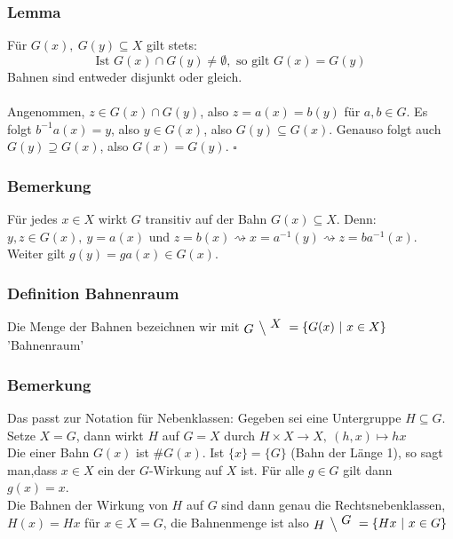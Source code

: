\subsubsection*{Lemma}
Für  $G(x),~G(y)\subseteq X$ gilt stets:\[ \text{Ist } G(x)\cap G(y)\not=\emptyset, \text{ so gilt } G(x)=G(y)\]
Bahnen sind entweder disjunkt oder gleich.\\

\\
Angenommen, $z\in G(x)\cap G(y)$, also $z=a(x)=b(y)$ für $a,b\in G$. Es folgt $b^{-1}a(x)=y$, also $y\in G(x)$, also $G(y)\subseteq G(x)$. Genauso folgt auch $G(y)\supseteq G(x)$, also $G(x)=G(y)$.
\hfill $\square$

\subsubsection*{Bemerkung}
Für jedes $x\in X$ wirkt $G$ transitiv auf der Bahn $G(x)\subseteq X$. Denn: $y,z\in G(x),~y=a(x)$ und $z=b(x)\rightsquigarrow x=a^{-1}(y) \rightsquigarrow z=ba^{-1}(x)$. Weiter gilt $g(y)=ga(x)\in G(x)$.
\subsubsection*{Definition Bahnenraum}
Die Menge der Bahnen bezeichnen wir mit $\xfrac{G}{X}=\{G(x)~|~x\in X \}$ 'Bahnenraum'
\subsubsection*{Bemerkung}
Das passt zur Notation für Nebenklassen: Gegeben sei eine Untergruppe $H\subseteq G$. Setze $X=G$, dann wirkt $H$ auf $G=X$ durch $H\times X\to X,~(h,x)\mapsto hx$\\
Die  einer Bahn $G(x)$ ist $\#G(x)$. Ist $\{x\}=\{G\}$ (Bahn der Länge 1), so sagt man,dass $x\in X$ ein  der $G$-Wirkung auf $X$ ist. Für alle $g\in G$ gilt dann $g(x)=x$.\\
Die Bahnen der Wirkung von $H$ auf $G$ sind dann genau die Rechtsnebenklassen, $H(x)=Hx$ für $x\in X=G$, die Bahnenmenge ist also $\xfrac{H}{G}=\{Hx~|~x\in G\}$


